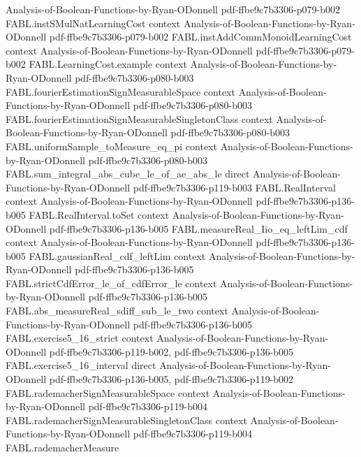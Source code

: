 \begin{theorem}
  {Analysis-of-Boolean-Functions-by-Ryan-ODonnell}
  {pdf-ffbe9c7b3306-p079-b002}
\proofstep
  {FABL.instSMulNatLearningCost}
  {context}
  {Analysis-of-Boolean-Functions-by-Ryan-ODonnell}
  {pdf-ffbe9c7b3306-p079-b002}
\proofstep
  {FABL.instAddCommMonoidLearningCost}
  {context}
  {Analysis-of-Boolean-Functions-by-Ryan-ODonnell}
  {pdf-ffbe9c7b3306-p079-b002}
\proofstep
  {FABL.LearningCost.example}
  {context}
  {Analysis-of-Boolean-Functions-by-Ryan-ODonnell}
  {pdf-ffbe9c7b3306-p080-b003}
\proofstep
  {FABL.fourierEstimationSignMeasurableSpace}
  {context}
  {Analysis-of-Boolean-Functions-by-Ryan-ODonnell}
  {pdf-ffbe9c7b3306-p080-b003}
\proofstep
  {FABL.fourierEstimationSignMeasurableSingletonClass}
  {context}
  {Analysis-of-Boolean-Functions-by-Ryan-ODonnell}
  {pdf-ffbe9c7b3306-p080-b003}
\proofstep
  {FABL.uniformSample_toMeasure_eq_pi}
  {context}
  {Analysis-of-Boolean-Functions-by-Ryan-ODonnell}
  {pdf-ffbe9c7b3306-p080-b003}
\proofstep
  {FABL.sum_integral_abs_cube_le_of_ae_abs_le}
  {direct}
  {Analysis-of-Boolean-Functions-by-Ryan-ODonnell}
  {pdf-ffbe9c7b3306-p119-b003}
\proofstep
  {FABL.RealInterval}
  {context}
  {Analysis-of-Boolean-Functions-by-Ryan-ODonnell}
  {pdf-ffbe9c7b3306-p136-b005}
\proofstep
  {FABL.RealInterval.toSet}
  {context}
  {Analysis-of-Boolean-Functions-by-Ryan-ODonnell}
  {pdf-ffbe9c7b3306-p136-b005}
\proofstep
  {FABL.measureReal_Iio_eq_leftLim_cdf}
  {context}
  {Analysis-of-Boolean-Functions-by-Ryan-ODonnell}
  {pdf-ffbe9c7b3306-p136-b005}
\proofstep
  {FABL.gaussianReal_cdf_leftLim}
  {context}
  {Analysis-of-Boolean-Functions-by-Ryan-ODonnell}
  {pdf-ffbe9c7b3306-p136-b005}
\proofstep
  {FABL.strictCdfError_le_of_cdfError_le}
  {context}
  {Analysis-of-Boolean-Functions-by-Ryan-ODonnell}
  {pdf-ffbe9c7b3306-p136-b005}
\proofstep
  {FABL.abs_measureReal_sdiff_sub_le_two}
  {context}
  {Analysis-of-Boolean-Functions-by-Ryan-ODonnell}
  {pdf-ffbe9c7b3306-p136-b005}
\proofstep
  {FABL.exercise5_16_strict}
  {context}
  {Analysis-of-Boolean-Functions-by-Ryan-ODonnell}
  {pdf-ffbe9c7b3306-p119-b002,
    pdf-ffbe9c7b3306-p136-b005}
\proofstep
  {FABL.exercise5_16_interval}
  {direct}
  {Analysis-of-Boolean-Functions-by-Ryan-ODonnell}
  {pdf-ffbe9c7b3306-p136-b005,
    pdf-ffbe9c7b3306-p119-b002}
\proofstep
  {FABL.rademacherSignMeasurableSpace}
  {context}
  {Analysis-of-Boolean-Functions-by-Ryan-ODonnell}
  {pdf-ffbe9c7b3306-p119-b004}
\proofstep
  {FABL.rademacherSignMeasurableSingletonClass}
  {context}
  {Analysis-of-Boolean-Functions-by-Ryan-ODonnell}
  {pdf-ffbe9c7b3306-p119-b004}
\proofstep
  {FABL.rademacherMeasure}

\end{theorem}

